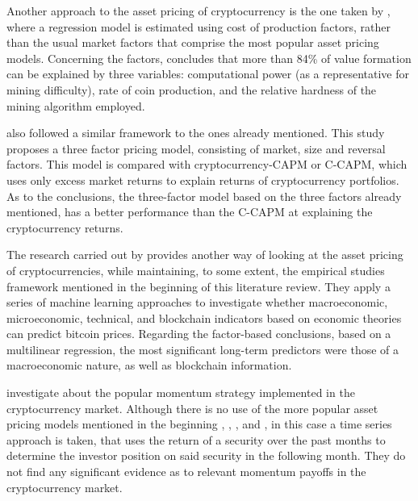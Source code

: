 Another approach to the asset pricing of cryptocurrency is the one taken by \parencite{HAYES20171308}, where a regression model is estimated using cost of production factors, rather than the usual market factors that comprise the most popular asset pricing models. Concerning the factors, \parencite{HAYES20171308} concludes that more than 84\% of value formation can be explained by three variables: computational power (as a representative for mining difficulty), rate of coin production, and the relative hardness of the mining algorithm employed.

\parencite{Shen2020} also followed a similar framework to the ones already mentioned. This study proposes a three factor pricing model, consisting of market, size and reversal factors. This model is compared with cryptocurrency-CAPM or C-CAPM, which uses only excess market returns to explain returns of cryptocurrency portfolios. As to the conclusions, the three-factor model based on the three factors already mentioned, has a better performance than the C-CAPM at explaining the cryptocurrency returns.

The research carried out by \parencite{Erfanian2022} provides another way of looking at the asset pricing of cryptocurrencies, while maintaining, to some extent, the empirical studies framework mentioned in the beginning of this literature review. They apply a series of machine learning approaches to investigate whether macroeconomic, microeconomic, technical, and blockchain indicators based on economic theories can predict bitcoin prices. Regarding the factor-based conclusions, based on a multilinear regression, the most significant long-term predictors were those of a macroeconomic nature, as well as blockchain information. 

\parencite{GROBYS20196} investigate about the popular momentum strategy implemented in the cryptocurrency market. Although there is no use of the more popular asset pricing models mentioned in the beginning \parencite{sharpe1964}, \parencite{fama1993}, \parencite{fama2015}, and \parencite{carhart1997}, in this case a time series approach is taken, that uses the return of a security over the past months to determine the investor position on said security in the following month. They do not find any significant evidence as to relevant momentum payoffs in the cryptocurrency market.

